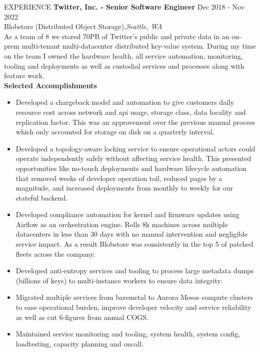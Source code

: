 \begin{rSection}{EXPERIENCE}
\textbf{Twitter, Inc. - Senior Software Engineer} \hfill Dec 2018 - Nov 2022\\
Blobstore (Distributed Object Storage),\hfill \textit{Seattle, WA}  \vspace{1em} \\
As a team of 8 we stored 70PB of Twitter's public and private data in an on-prem multi-tenant multi-datacenter distributed key-value system. During my time on the team I owned the hardware health, all service automation, monitoring, tooling and deployments as well as custodial services and processes along with feature work.
\vspace{1em}\\
{\bf Selected Accomplishments}
 \begin{itemize}
    \itemsep -3pt {} 
     \item Developed a chargeback model and automation to give customers daily resource cost across network and api usage, storage class, data locality and replication factor. This was an approvement over the previous manual process which only accounted for storage on disk on a quarterly interval. 
     \item Developed a topology-aware locking service to ensure operational actors could operate independently safely without affecting service health. This presented opportunities like no-touch deployments and hardware lifecycle automation that removed weeks of developer operation toil, reduced pages by a magnitude, and increased deployments from monthly to weekly for our stateful backend. 
     \item Developed compliance automation for kernel and firmware updates using Airflow as an orchestration engine. Rolls 8k machines across multiple datacenters in less than 30 days with no manual intervention and negligible service impact. As a result Blobstore was consistently in the top 5 of patched fleets across the company. 
     \item Developed anti-entropy services and tooling to process large metadata dumps (billions of keys) to multi-instance workers to ensure data integrity. 
     \item Migrated multiple services from baremetal to Aurora Mesos compute clusters to ease operational burden, improve developer velocity and service reliability as well as cut 6-figures from annual COGS.
     \item Maintained service monitoring and tooling, system health, system config, loadtesting, capacity planning and oncall.

\end{itemize}
\end{rSection}
